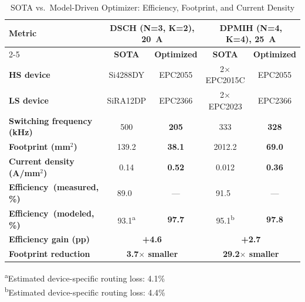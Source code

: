 \documentclass[conference]{IEEEtran}
\begin{document}
\begin{table}[t]
\renewcommand{\arraystretch}{1.45}
\caption{SOTA vs.\ Model-Driven Optimizer: Efficiency, Footprint, 
and Current Density}
\label{tab:comparison}
\centering
\scriptsize
\setlength{\tabcolsep}{2pt}
\begin{tabular}{|l|c|c|c|c|}
\hline

\textbf{Metric} 
  & \multicolumn{2}{c|}{\textbf{DSCH (N=3, K=2), 20~A}} 
  & \multicolumn{2}{c|}{\textbf{DPMIH (N=4, K=4), 25~A}} \\
\cline{2-5}

  & \textbf{SOTA \cite{DSCH}} & \textbf{Optimized} 
  & \textbf{SOTA \cite{DPMIH44}} & \textbf{Optimized} \\
\hline

\textbf{HS device} 
  &  Si4288DY & EPC2055 
  & 2$\times$EPC2015C & EPC2055 \\
\hline

\textbf{LS device} 
  & SiRA12DP & EPC2366 
  & 2$\times$EPC2023  & EPC2366 \\
\hline

\textbf{Switching frequency (kHz)} 
  & 500 & \textbf{205} 
  & 333 & \textbf{328} \\
\hline

\textbf{Footprint (mm$^2$)} 
  & 139.2 & \textbf{38.1} 
  & 2012.2  & \textbf{69.0} \\
\hline

\textbf{Current density (A/mm$^2$)} 
  & 0.14 & \textbf{0.52} 
  & 0.012 & \textbf{0.36} \\
\hline

\textbf{Efficiency\ (measured, \%)} 
  & 89.0~\cite{DSCH} & --- 
  & 91.5~\cite{DPMIH44} & --- \\
\hline

\textbf{Efficiency\ (modeled, \%)} 
  & 93.1\textsuperscript{a} & \textbf{97.7} 
  & 95.1\textsuperscript{b} & \textbf{97.8} \\
\hline


\textbf{Efficiency gain (pp)} 
  & \multicolumn{2}{c|}{\textbf{+4.6}} 
  & \multicolumn{2}{c|}{\textbf{+2.7}} \\
\hline


\textbf{Footprint reduction} 
  & \multicolumn{2}{c|}{\textbf{3.7$\times$ smaller}} 
  & \multicolumn{2}{c|}{\textbf{29.2$\times$ smaller}} \\
\hline
\end{tabular}

\begin{flushleft}
    \scriptsize 
    \textsuperscript{a}Estimated device-specific routing loss: 4.1\%\\
    \textsuperscript{b}Estimated device-specific routing loss: 4.4\%
\end{flushleft}
\vspace{-15pt}
\end{table}
\end{document}
